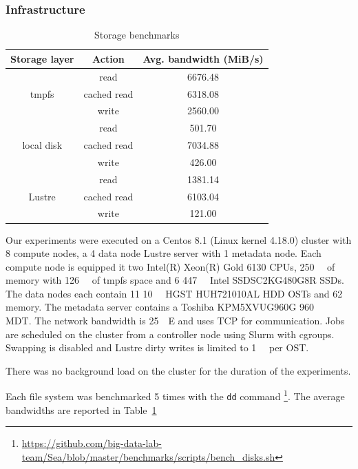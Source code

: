 \documentclass[10pt,journal,compsoc]{IEEEtran}
\begin{document}
\subsubsection{Infrastructure}
      \begin{table}
      \centering
      \begin{tabular}{ccc}
       \toprule
       Storage layer & Action & Avg. bandwidth (MiB/s) \\
       \midrule
      \multirow{3}{*}{tmpfs} & read & 6676.48 \\
      & cached read & 6318.08  \\
      & write & 2560.00 \\
      \midrule
       \multirow{3}{*}{local disk} & read & 501.70  \\
       & cached read & 7034.88 \\
       & write & 426.00 \\
       \midrule
       \multirow{3}{*}{Lustre} & read & 1381.14 \\
       & cached read & 6103.04  \\
       & write & 121.00  \\

       \bottomrule

      \end{tabular}
      \caption{Storage benchmarks}
      \label{table:sea-comp:fs}
      \end{table}
            Our experiments were executed on a Centos 8.1 (Linux kernel 4.18.0)
      cluster with 8 compute nodes, a 4 data node Lustre server with 1
      metadata node. Each compute node is equipped it two Intel(R) Xeon(R) Gold
      6130 CPUs, \SI{250}{\gibi\byte} of memory with \SI{126}{\gibi\byte} of
      tmpfs space and 6 \SI{447}{\gibi\byte} Intel SSDSC2KG480G8R SSDs. The data
      nodes each contain 11 \SI{10}{\tera\byte} HGST HUH721010AL HDD OSTs and
      \SI{62}{\gibi\byte} memory. The metadata server contains a Toshiba
      KPM5XVUG960G \SI{960}{\giga\byte} MDT. The network bandwidth is
      \SI{25}{\giga\bit}E and uses TCP for communication. Jobs are scheduled on
      the cluster from a controller node using Slurm with cgroups. Swapping is
      disabled and Lustre dirty writes is limited to \SI{1}{\giga\byte} per OST.


      There was no background load on the cluster for the duration of the experiments.


      Each file system was benchmarked 5 times with the \texttt{dd} command \footnote{\url{https://github.com/big-data-lab-team/Sea/blob/master/benchmarks/scripts/bench_disks.sh}}.
      The average bandwidths are reported in Table~\ref{table:sea-comp:fs}
\end{document}
